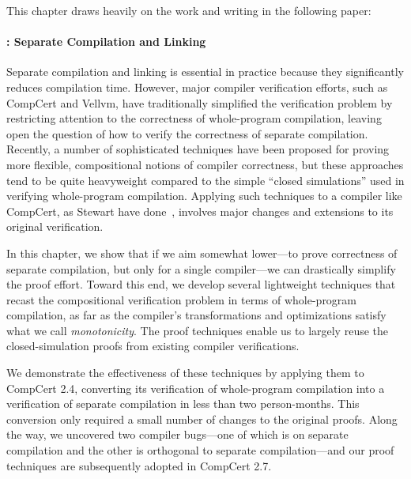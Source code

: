 This chapter draws heavily on the work and writing in the following paper:



\paragraph{: Separate Compilation and Linking}

Separate compilation and linking is essential in practice because they significantly reduces
compilation time.  However, major compiler verification efforts, such as CompCert and Vellvm, have
traditionally simplified the verification problem by restricting attention to the correctness of
whole-program compilation, leaving open the question of how to verify the correctness of separate
compilation.  Recently, a number of sophisticated techniques have been proposed for proving more
flexible, compositional notions of compiler correctness, but these approaches tend to be quite
heavyweight compared to the simple ``closed simulations'' used in verifying whole-program
compilation.  Applying such techniques to a compiler like CompCert, as Stewart \etal{} have
done~\cite{compositional-compcert}, involves major changes and extensions to its original
verification.

In this chapter, we show that if we aim somewhat lower---to prove correctness of separate
compilation, but only for a single compiler---we can drastically simplify the proof effort.  Toward
this end, we develop several lightweight techniques that recast the compositional verification
problem in terms of whole-program compilation, as far as the compiler's transformations and
optimizations satisfy what we call \emph{monotonicity}.  The proof techniques enable us to largely
reuse the closed-simulation proofs from existing compiler verifications.

We demonstrate the effectiveness of these techniques by applying them to CompCert 2.4, converting
its verification of whole-program compilation into a verification of separate compilation in less
than two person-months.  This conversion only required a small number of changes to the original
proofs.  Along the way, we uncovered two compiler bugs---one of which is on separate compilation and
the other is orthogonal to separate compilation---and our proof techniques are subsequently adopted
in CompCert 2.7.


